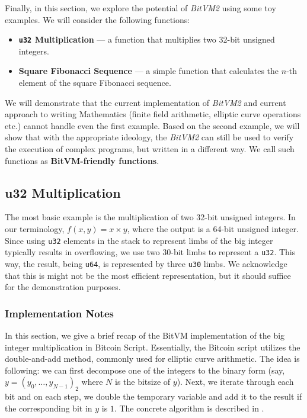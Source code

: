 \documentclass{iacrtrans}
\begin{document}
Finally, in this section, we explore the potential of \textit{BitVM2} using some toy
examples. We will consider the following functions:
\begin{itemize}
  \item \textbf{\texttt{u32} Multiplication} --- a function that
    multiplies two 32-bit unsigned integers.
  \item \textbf{Square Fibonacci Sequence} --- a simple function that
    calculates the $n$-th element of the square Fibonacci sequence.
\end{itemize}

We will demonstrate that the current implementation of \textit{BitVM2} and current
approach to writing Mathematics (finite field arithmetic, elliptic curve
operations etc.) cannot handle even the first example. Based on the second
example, we will show that with the appropriate ideology, the \textit{BitVM2} can still
be used to verify the execution of complex programs, but written in a different
way. We call such functions as \textbf{BitVM-friendly functions}.
\subsection{u32 Multiplication}

The most basic example is the multiplication of two 32-bit unsigned integers. In
our terminology, $f(x,y) = x \times y$, where the output is a 64-bit unsigned
integer. Since using \texttt{u32} elements in the stack to represent limbs of
the big integer typically results in overflowing, we use two $30$-bit limbs to
represent a \texttt{u32}. This way, the result, being \texttt{u64}, is
represented by three \texttt{u30} limbs. We acknowledge that this is might not
be the most efficient representation, but it should suffice for the
demonstration purposes.

\subsubsection{Implementation Notes}

In this section, we give a brief recap of the BitVM implementation of the big
integer multiplication in Bitcoin Script. Essentially, the Bitcoin script
utilizes the double-and-add method, commonly used for elliptic curve arithmetic.
The idea is following: we can first decompose one of the integers to the binary
form (say, $y=(y_0,\dots,y_{N-1})_2$ where $N$ is the bitsize of $y$). Next, we
iterate through each bit and on each step, we double the temporary variable and
add it to the result if the corresponding bit in $y$ is $1$. The concrete
algorithm is described in .
\end{document}
